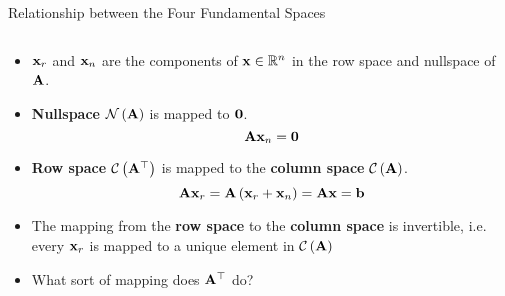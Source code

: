 \documentclass[aspectratio=169]{beamer}
\let\olditem\item
\renewcommand{\item}{\setlength{\itemsep}{\fill}\olditem}
\def\mf{\ensuremath\mathbf}
\def\mb{\ensuremath\mathbb}
\def\mc{\ensuremath\mathcal}
\def\lp{\ensuremath\left(}
\def\rp{\ensuremath\right)}
\begin{document}
\begin{frame}[t]{Relationship between the Four Fundamental Spaces}
\begin{columns}
\begin{column}{0.4\textwidth}
\begin{footnotesize}
\begin{itemize}
    \item $\mf{x}_r$ and $\mf{x}_n$ are the components of $\mf{x} \in \mb{R}^n$ in the row space and nullspace of $\mf{A}$.
    \item \textbf{Nullspace} $\mc{N}\lp\mf{A}\rp$ is mapped to $\mf{0}$.
    \[ \mf{A}\mf{x}_n = \mf{0} \]
    \item \textbf{Row space} $\mc{C}\lp\mf{A}^\top\rp$ is mapped to the \textbf{column space} $\mc{C}\lp\mf{A}\rp$.
    \[ \mf{A}\mf{x}_r = \mf{A}\lp\mf{x}_r + \mf{x}_n\rp = \mf{Ax} = \mf{b} \]
    \item The mapping from the \textbf{row space} to the \textbf{column space} is invertible, i.e. every $\mf{x}_r$ is mapped to a unique element in $\mc{C}\lp\mf{A}\rp$
    \item What sort of mapping does $\mf{A}^\top$ do?
\end{itemize}
\end{footnotesize}
\end{column}
\end{columns}
\end{frame}
\end{document}
